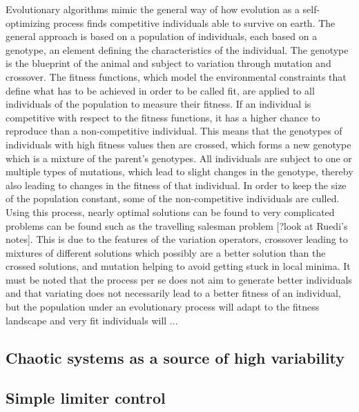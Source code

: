 \documentclass[main]{subfiles}
\begin{document}
Evolutionary algorithms mimic the general way of how evolution as a self-optimizing process finds competitive individuals able to survive on earth. The general approach is based on a population of individuals, each based on a genotype, an element defining the characteristics of the individual. The genotype is the blueprint of the animal and subject to variation through mutation and crossover. The fitness functions, which model the environmental constraints that define what has to be achieved in order to be called fit, are applied to all individuals of the population to measure their fitness. If an individual is competitive with respect to the fitness functions, it has a higher chance to reproduce than a non-competitive individual. This means that the genotypes of individuals with high fitness values then are crossed, which forms a new genotype which is a mixture of the parent's genotypes. All individuals are subject to one or multiple types of mutations, which lead to slight changes in the genotype, thereby also leading to changes in the fitness of that individual. In order to keep the size of the population constant, some of the non-competitive individuals are culled. Using this process, nearly optimal solutions can be found to very complicated problems can be found such as the travelling salesman problem [?look at Ruedi's notes]. This is due to the features of the variation operators, crossover leading to mixtures of different solutions which possibly are a better solution than the crossed solutions, and mutation helping to avoid getting stuck in local minima. It must be noted that the process per se does not aim to generate better individuals and that variating does not necessarily lead to a better fitness of an individual, but the population under an evolutionary process will adapt to the fitness landscape and very fit individuals will ...


\subsection{Chaotic systems as a source of high variability}

\lipsum[1]



\subsection{Simple limiter control}

\lipsum[1]

\end{document}
